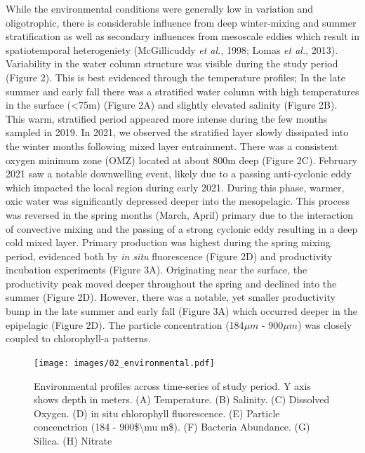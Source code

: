 \documentclass[
]{article}
\begin{document}
While the environmental conditions were generally low in variation and
oligotrophic, there is considerable influence from deep winter-mixing
and summer stratification as well as secondary influences from mesoscale
eddies which result in spatiotemporal heterogeniety (McGillicuddy
\emph{et al.}, 1998; Lomas \emph{et al.}, 2013). Variability in the
water column structure was visible during the study period (Figure 2).
This is best evidenced through the temperature profiles; In the late
summer and early fall there was a stratified water column with high
temperatures in the surface (\textless75m) (Figure 2A) and slightly
elevated salinity (Figure 2B). This warm, stratified period appeared
more intense during the few months sampled in 2019. In 2021, we observed
the stratified layer slowly dissipated into the winter months following
mixed layer entrainment. There was a consistent oxygen minimum zone
(OMZ) located at about 800m deep (Figure 2C). February 2021 saw a
notable downwelling event, likely due to a passing anti-cyclonic eddy
which impacted the local region during early 2021. During this phase,
warmer, oxic water was significantly depressed deeper into the
mesopelagic. This process was reversed in the spring months (March,
April) primary due to the interaction of convective mixing and the
passing of a strong cyclonic eddy resulting in a deep cold mixed layer.
Primary production was highest during the spring mixing period,
evidenced both by \emph{in situ} fluorescence (Figure 2D) and
productivity incubation experiments (Figure 3A). Originating near the
surface, the productivity peak moved deeper throughout the spring and
declined into the summer (Figure 2D). However, there was a notable, yet
smaller productivity bump in the late summer and early fall (Figure 3A)
which occurred deeper in the epipelagic (Figure 2D). The particle
concentration (184\(\mu m\) - 900\(\mu m\)) was closely coupled to
chlorophyll-a patterns.

\begin{figure}

{\centering \texttt{[image: images/02\_environmental.pdf]}

}

\caption{Environmental profiles across time-series of study period. Y
axis shows depth in meters. (A) Temperature. (B) Salinity. (C) Dissolved
Oxygen. (D) in situ chlorophyll fluorescence. (E) Particle concenctrion
(184 - 900\$\textbackslash mu m\$). (F) Bacteria Abundance. (G) Silica.
(H) Nitrate}

\end{figure}
\end{document}
